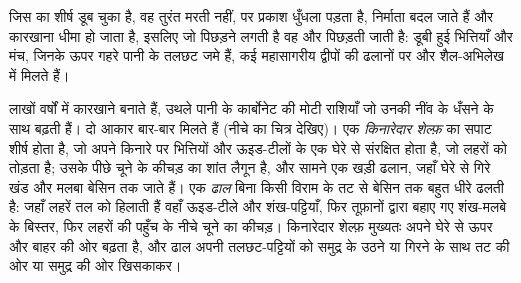 जिस  का शीर्ष डूब चुका है, वह तुरंत मरती नहीं, पर प्रकाश धुँधला पड़ता है, निर्माता बदल जाते हैं और कारखाना धीमा हो जाता है, इसलिए जो  पिछड़ने लगती है वह और पिछड़ती जाती है: डूबी हुई भित्तियाँ और मंच, जिनके ऊपर गहरे पानी के तलछट जमे हैं, कई महासागरीय द्वीपों की ढलानों पर और शैल-अभिलेख में मिलते हैं।

लाखों वर्षों में कारखाने  बनाते हैं, उथले पानी के कार्बोनेट की मोटी राशियाँ जो उनकी नींव के धँसने के साथ बढ़ती हैं। दो आकार बार-बार मिलते हैं (नीचे का चित्र देखिए)। एक \emph{किनारेदार शेल्फ़} का सपाट शीर्ष होता है, जो अपने किनारे पर भित्तियों और ऊइड-टीलों के एक घेरे से संरक्षित होता है, जो लहरों को तोड़ता है; उसके पीछे चूने के कीचड़ का शांत लैगून है, और सामने एक खड़ी ढलान, जहाँ घेरे से गिरे खंड और मलबा बेसिन तक जाते हैं। एक \emph{ढाल} बिना किसी विराम के तट से बेसिन तक बहुत धीरे ढलती है: जहाँ लहरें तल को हिलाती हैं वहाँ ऊइड-टीले और शंख-पट्टियाँ, फिर तूफ़ानों द्वारा बहाए गए शंख-मलबे के बिस्तर, फिर लहरों की पहुँच के नीचे चूने का कीचड़। किनारेदार शेल्फ़ मुख्यतः अपने घेरे से ऊपर और बाहर की ओर बढ़ता है, और ढाल अपनी तलछट-पट्टियों को समुद्र के उठने या गिरने के साथ तट की ओर या समुद्र की ओर खिसकाकर।

